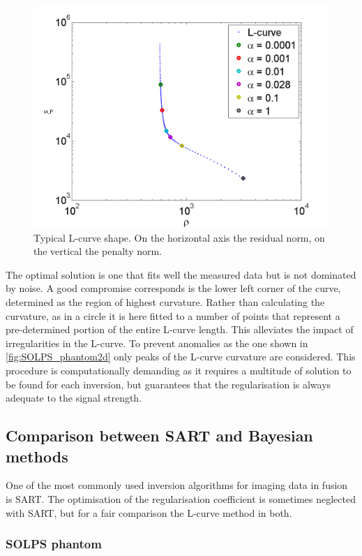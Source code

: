 \begin{figure}
	\centering
	\includegraphics[width=0.7\linewidth]{Chapters/chapter2/figs/l-curve.png}
	\caption{Typical L-curve shape. On the horizontal axis the residual norm, on the vertical the penalty norm.\cite{Schou2015}}
	\label{fig:l-curve}
\end{figure}

The optimal solution is one that fits well the measured data but is not dominated by noise. A good compromise corresponds is the lower left corner of the curve, determined as the region of highest curvature. Rather than calculating the curvature, as in \cite{Schou2015} a circle it is here fitted to a number of points that represent a pre-determined portion of the entire L-curve length. This alleviates the impact of irregularities in the L-curve. To prevent anomalies as the one shown in \autoref{fig:SOLPS_phantom2d} only peaks of the L-curve curvature are considered. This procedure is computationally demanding as it requires a multitude of solution to be found for each inversion, but guarantees that the regularisation is always adequate to the signal strength.

\subsection{Comparison between SART and Bayesian methods}
One of the most commonly used inversion algorithms for imaging data in fusion is SART. The optimisation of the regularisation coefficient is sometimes neglected with SART, but for a fair comparison the L-curve method in both.

\subsubsection{SOLPS phantom}\label{SOLPS phantom}

